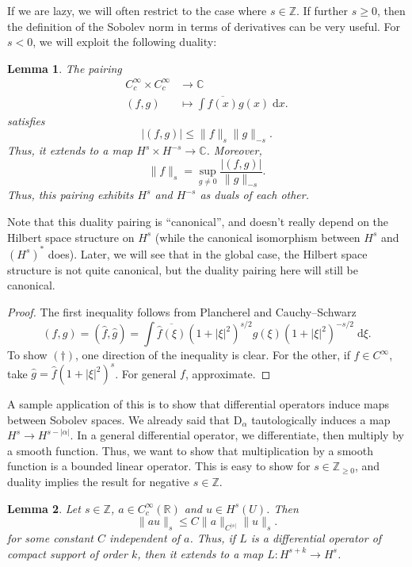 \documentclass{shortart}
\newtheorem*{lemma}{Lemma}
\theoremstyle{definition}
\newcommand\R{\mathbb{R}}
\newcommand\Z{\mathbb{Z}}
\newcommand\C{\mathbb{C}}
\newcommand\der{\mathrm{d}}
\newcommand\D{\mathrm{D}}
\begin{document}
If we are lazy, we will often restrict to the case where $s \in \Z$. If further $s \geq 0$, then the definition of the Sobolev norm in terms of derivatives can be very useful. For $s < 0$, we will exploit the following duality:
\begin{lemma}
  The pairing
  \begin{align*}
    C_c^\infty \times C_c^\infty &\to \C\\
    (f, g) &\mapsto \int \overline{f(x)} g(x) \;\der x.
  \end{align*}
  satisfies
  \[
    |(f, g)| \leq \|f\|_s \|g\|_{-s}.
  \]
  Thus, it extends to a map $H^s \times H^{-s} \to \C$. Moreover,
  \[
    \|f\|_s = \sup_{g \not= 0} \frac{|(f, g)|}{\|g\|_{-s}}.\tag{$\dagger$}
  \]
  Thus, this pairing exhibits $H^s$ and $H^{-s}$ as duals of each other.
\end{lemma}
Note that this duality pairing is ``canonical'', and doesn't really depend on the Hilbert space structure on $H^s$ (while the canonical isomorphism between $H^s$ and $(H^s)^*$ does). Later, we will see that in the global case, the Hilbert space structure is not quite canonical, but the duality pairing here will still be canonical.

\begin{proof}
  The first inequality follows from Plancherel and Cauchy--Schwarz
  \[
    (f, g) = (\hat{f}, \hat{g}) = \int \overline{\hat{f}(\xi)}(1 + |\xi|^2)^{s/2} \hat{g}(\xi) (1 + |\xi|^2)^{-s/2}\;\der \xi.
  \]
  To show $(\dagger)$, one direction of the inequality is clear. For the other, if $f \in C^\infty$, take $\hat{g} = \hat{f} (1 + |\xi|^2)^s$. For general $f$, approximate.
\end{proof}

A sample application of this is to show that differential operators induce maps between Sobolev spaces. We already said that $\D_\alpha$ tautologically induces a map $H^s \to H^{s - |\alpha|}$. In a general differential operator, we differentiate, then multiply by a smooth function. Thus, we want to show that multiplication by a smooth function is a bounded linear operator. This is easy to show for $s \in \Z_{\geq 0}$, and duality implies the result for negative $s \in \Z$.

\begin{lemma}
   Let $s \in \Z$, $a \in C_c^\infty(\R)$ and $u \in H^s(U)$. Then
  \[
    \|au\|_s \leq C\|a\|_{C^{|s|}} \|u\|_s.
  \]
  for some constant $C$ independent of $a$. Thus, if $L$ is a differential operator of compact support of order $k$, then it extends to a map $L: H^{s + k} \to H^s$.
\end{lemma}
\end{document}
